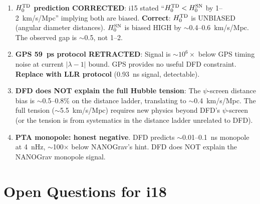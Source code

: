\documentclass[11pt,a4paper]{article}
\begin{document}
\begin{tcolorbox}[colback=red!5!white, colframe=red!70!black,
  title=\textbf{W4i17 CORRECTIONS}]

\begin{enumerate}

\item \textbf{$H_0^{\rm TD}$ prediction CORRECTED}: i15 stated
  ``$H_0^{\rm TD} < H_0^{\rm SN}$ by 1--2~km/s/Mpc'' implying
  both are biased. \textbf{Correct}: $H_0^{\rm TD}$ is UNBIASED
  (angular diameter distances). $H_0^{\rm SN}$ is biased HIGH
  by $\sim$0.4--0.6~km/s/Mpc. The observed gap is $\sim$0.5,
  not 1--2.

\item \textbf{GPS 59~ps protocol RETRACTED}: Signal is
  $\sim 10^6\times$ below GPS timing noise at current
  $|\lambda - 1|$ bound. GPS provides no useful DFD constraint.
  \textbf{Replace with LLR protocol} (0.93~ns signal, detectable).

\item \textbf{DFD does NOT explain the full Hubble tension}:
  The $\psi$-screen distance bias is $\sim$0.5--0.8\% on the
  distance ladder, translating to $\sim$0.4~km/s/Mpc.
  The full tension ($\sim$5.5~km/s/Mpc) requires new physics
  beyond DFD's $\psi$-screen (or the tension is from systematics
  in the distance ladder unrelated to DFD).

\item \textbf{PTA monopole: honest negative}. DFD predicts
  $\sim$0.01--0.1~ns monopole at 4~nHz, $\sim$100$\times$
  below NANOGrav's hint. DFD does NOT explain the
  NANOGrav monopole signal.

\end{enumerate}

\end{tcolorbox}


\section*{Open Questions for i18}
\end{document}
